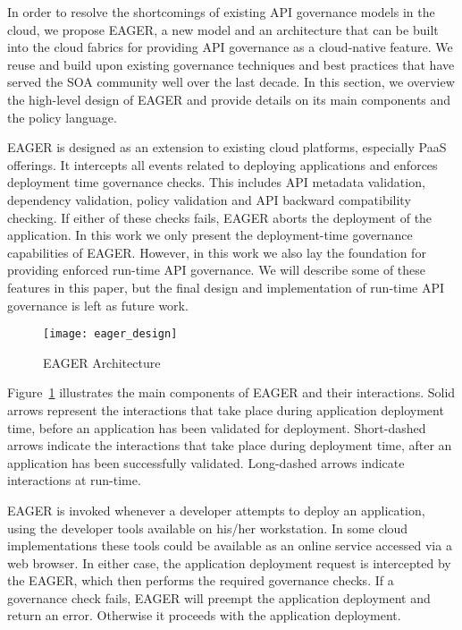 In order to resolve the shortcomings of existing API governance models in the cloud, we propose EAGER, a new model and an architecture
that can be built into the cloud fabrics for providing API governance as a cloud-native feature. We reuse and build upon existing governance
techniques and best practices that have served the SOA community well over the last decade. In this section, we overview the high-level
design of EAGER and provide details on its main components and the policy language.

EAGER is designed as an extension to existing cloud platforms, especially PaaS offerings. It intercepts all events related to deploying applications
and enforces deployment time governance checks. This includes API metadata validation, dependency validation, policy validation and 
API backward compatibility
checking. If either of these checks fails, EAGER aborts the deployment of the application.
In this work we only present the deployment-time governance capabilities of EAGER. However, in this work we also lay the foundation for
providing enforced run-time API governance. We will describe some of these features in this paper, but the final design and implementation of
run-time API governance is left as future work.

\begin{figure}
\centering
\texttt{[image: eager\_design]}
\caption{EAGER Architecture}
\label{fig:eager_design}
\end{figure}

Figure~\ref{fig:eager_design} illustrates the main components of EAGER and their interactions. Solid arrows represent the interactions that take
place during application deployment time, before an application has been validated for deployment. Short-dashed arrows indicate
the interactions that take place during deployment time, after an application has been successfully validated. Long-dashed arrows indicate
interactions at run-time.

EAGER is invoked whenever a developer attempts to deploy an application, using the developer
tools available on his/her workstation. In some cloud implementations these tools could be available as an online service accessed 
via a web browser. In either case, the application deployment request is intercepted by the EAGER, which
then performs the required governance checks. If a governance check fails, EAGER
will preempt the application deployment and return an error. Otherwise it proceeds with the application deployment.

